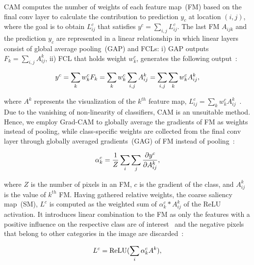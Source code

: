 \documentclass[conference]{IEEEtran}
\begin{document}
\iffalse
CAM computes the number of weights of each feature map~(FM) based on the final conv layer to calculate the contribution to prediction $y_c$ at location $(i,j)$, where the goal is to obtain $L_{ij}^{c}$ that satisfies $y^{c}=\sum_{i, j} L_{ij}^{c}$. The last FM $A_{ijk}$ and the prediction $y_c$ are represented in a linear relationship in which linear layers consist of global average pooling~(GAP) and FCLs: i) GAP outputs $F_{k}=\sum_{i,j} A^k_{ij}$, ii) FCL that holds weight $w_{k}^{c}$, generates the following output~\cite{kim2020extending}: 
 
 \begin{equation}
 \scriptsize{
     y^{c}=\sum_{k} w_{k}^{c} F_{k}=\sum_{k} w_{k}^{c} \sum_{i,j} A^k_{ij}=\sum_{i, j} \sum_{k} w_{k}^{c} A^k_{ij},}
 \end{equation}
 
where $A^{k}$ represents the visualization of the $k^{th}$ feature map, $L_{i j}^{c}=\sum_{k} w_{k}^{c} A^k_{ij}$~\cite{kim2020extending}. Due to the vanishing of non-linearity of classifiers, CAM is an unsuitable method. Hence, we employ Grad-CAM to globally average the gradients of FM as weights instead of pooling, while class-specific weights are collected from the final conv layer through globally averaged gradients~(GAG) of FM instead of pooling~\cite{chattopadhay2018grad}: 

\begin{equation}
\scriptsize{
    \alpha_k^c=\frac{1}{Z}\sum_{i}\sum_{j}\frac{\partial y^c}{\partial A_{ij}^k},}
    \label{eq:alpha}
\end{equation}

where $Z$ is the number of pixels in an FM, $c$ is the gradient of the class, and $A_{ij}^k$ is the value of $k^{th}$ FM. Having gathered relative weights, the coarse saliency map~(SM), $L^c$ is computed as the weighted sum of $\alpha_k^c*A_{ij}^k$ of the ReLU activation.
It introduces linear combination to the FM as only the features with a positive influence on the respective class are of interest~\cite{chattopadhay2018grad} and the negative pixels that belong to other categories in the image are discarded~\cite{114}:

\vspace{-2mm}
\begin{equation}
\scriptsize{
    L^c=\operatorname{ReLU}(\sum_{i}\alpha_k^cA^k),}
    \label{3.11}
\end{equation}
\vspace{-4mm}
\end{document}
